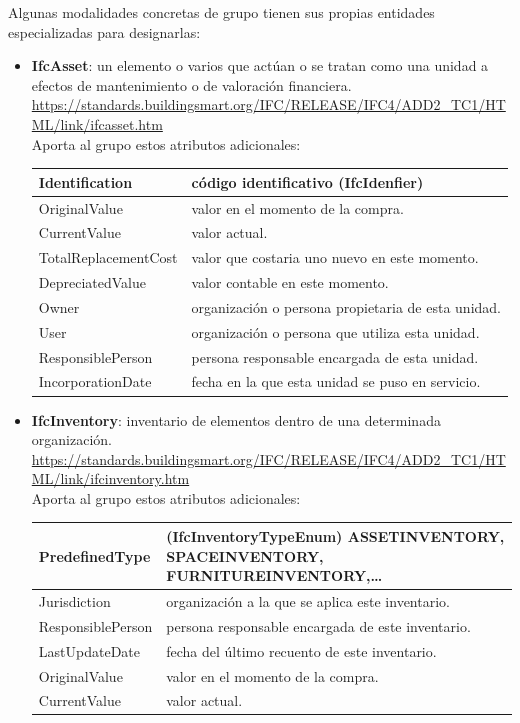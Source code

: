 \documentclass[spanish,12pt,a4paper,final,oneside]{book}
\begin{document}
\vspace{0.3cm}
Algunas modalidades concretas de grupo tienen sus propias entidades especializadas para designarlas:
\begin{itemize}

\item \textbf{IfcAsset}: un elemento o varios que actúan o se tratan como  una unidad a efectos de mantenimiento o de valoración financiera.
\\ \url{https://standards.buildingsmart.org/IFC/RELEASE/IFC4/ADD2_TC1/HTML/link/ifcasset.htm}
\\Aporta al grupo estos atributos adicionales:
\\ \begin{longtable}{|p{3cm} p{10cm}|}
\hline
Identification & código identificativo (IfcIdenfier)
\\[0.1cm] \hline
OriginalValue & valor en el momento de la compra.
\\[0.1cm] \hline
CurrentValue & valor actual.
\\[0.1cm] \hline
TotalReplacementCost & valor que costaria uno nuevo en este momento.
\\[0.1cm] \hline
DepreciatedValue & valor contable en este momento.
\\[0.1cm] \hline
Owner & organización o persona propietaria de esta unidad.
\\[0.1cm] \hline
User & organización o persona que utiliza esta unidad.
\\[0.1cm] \hline
ResponsiblePerson & persona responsable encargada de esta unidad.
\\[0.1cm] \hline
IncorporationDate & fecha en la que esta unidad se puso en servicio.
\\[0.1cm] \hline
\end{longtable}

\item \textbf{IfcInventory}: inventario de elementos dentro de una determinada organización.
\\ \url{https://standards.buildingsmart.org/IFC/RELEASE/IFC4/ADD2_TC1/HTML/link/ifcinventory.htm}
\\Aporta al grupo estos atributos adicionales:
\\ \begin{longtable}{|p{2.5cm} p{11cm}|}
\hline
PredefinedType & (IfcInventoryTypeEnum) ASSETINVENTORY, SPACEINVENTORY, FURNITUREINVENTORY,\ldots
\\[0.1cm] \hline
Jurisdiction & organización a la que se aplica este inventario.
\\[0.1cm] \hline
ResponsiblePerson & persona responsable encargada de este inventario.
\\[0.1cm] \hline
LastUpdateDate & fecha del último recuento de este inventario.
\\[0.1cm] \hline
OriginalValue & valor en el momento de la compra.
\\[0.1cm] \hline
CurrentValue & valor actual.
\\[0.1cm] \hline
\end{longtable}


\end{itemize}
\end{document}
